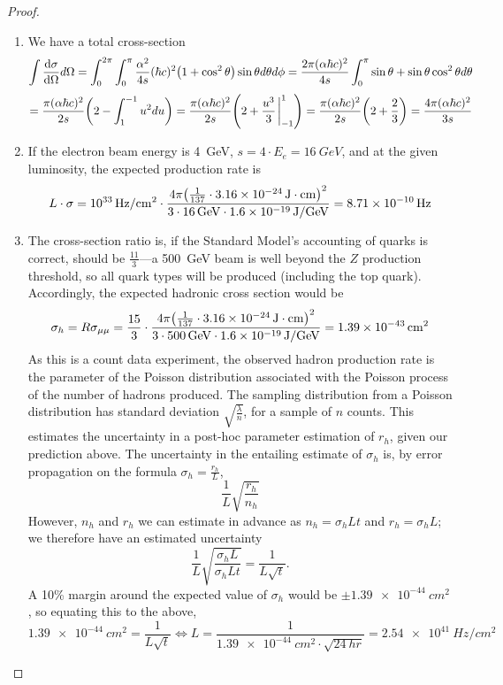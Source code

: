 \documentclass{article}
\begin{document}
\begin{proof} \;
  \begin{enumerate}
  \item We have a total cross-section
    \[
      \int \dv{\sigma}{\Omega} d\Omega = \int_{0}^{2\pi}\int_{0}^{\pi}\frac{\alpha^{2}}{4s}(\hbar c)^{2}\qty(1 + \cos^{2}\theta)\sin\theta
      d\theta d\phi
      = \frac{2\pi(\alpha\hbar c)^{2}}{4s}\int_{0}^{\pi}\sin\theta + \sin\theta\cos^{2}\theta d\theta
    \]
    \[
      = \frac{\pi(\alpha\hbar c)^{2}}{2s}\qty(2 - \int_{1}^{-1}u^{2}du)
      = \frac{\pi(\alpha\hbar c)^{2}}{2s}\qty(2 + \frac{u^{3}}{3}\eval_{-1}^{1})
      = \frac{\pi(\alpha\hbar c)^{2}}{2s}\qty(2 + \frac{2}{3})
      = \frac{4\pi(\alpha\hbar c)^{2}}{3s}
    \]
  \item If the electron beam energy is \SI{4}{GeV}, $s = 4 \cdot E_{e} = \SI{16}{GeV}$, and at the given luminosity,
    the expected production rate is
    \[
      L \cdot \sigma = \SI{e33}{Hz/cm^{2}} \cdot \frac{4\pi\qty(\frac{1}{137} \cdot \SI{3.16e-24}{J \cdot cm})^{2}}
      {3 \cdot \SI{16}{GeV} \cdot \SI{1.6e-19}{J/GeV}}
      = \SI{8.71e-10}{Hz}
    \]
  \item The cross-section ratio is, if the Standard Model's accounting of quarks is correct, should be $\frac{11}{3}$---a
    \SI{500}{GeV} beam is well beyond the $Z$ production threshold, so all quark types will be produced (including the top quark).
    Accordingly, the expected hadronic cross section would be
    \[
      \sigma_{h} = R\sigma_{\mu\mu} = \frac{15}{3} \cdot \frac{4\pi \qty(\frac{1}{137} \cdot \SI{3.16e-24}{J \cdot cm})^{2}}
      {3 \cdot \SI{500}{GeV} \cdot \SI{1.6e-19}{J/GeV}}
      = \SI{1.39e-43}{cm^{2}}
    \]
    As this is a count data experiment, the observed hadron production rate is the parameter of the Poisson distribution
    associated with the Poisson process of the number of hadrons produced.
    The sampling distribution from a Poisson distribution has standard deviation $\sqrt{\frac{\lambda}{n}}$,
    for a sample of $n$ counts.
    This estimates the uncertainty in a post-hoc parameter estimation of $r_{h}$, given our prediction above.
    The uncertainty in the entailing estimate of $\sigma_{h}$ is, by error propagation on the formula $\sigma_{h} = \frac{r_{h}}{L}$,
    \[
      \frac{1}{L}\sqrt{\frac{r_{h}}{n_{h}}}
    \]
    However, $n_{h}$ and $r_{h}$ we can estimate in advance as $n_{h} = \sigma_{h}Lt$ and $r_{h} = \sigma_{h}L$;
    we therefore have an estimated uncertainty
    \[
      \frac{1}{L}\sqrt{\frac{\sigma_{h}L}{\sigma_{h}Lt}} = \frac{1}{L\sqrt{t}}.
    \]
    A 10\% margin around the expected value of $\sigma_{h}$ would be $\pm \SI{1.39e-44}{cm^{2}}$, so equating this to the above,
    \[
      \SI{1.39e-44}{cm^{2}} = \frac{1}{L\sqrt{t}} \Leftrightarrow L = \frac{1}{\SI{1.39e-44}{cm^{2}} \cdot \sqrt{\SI{24}{hr}}}
      = \SI{2.54e41}{Hz/cm^{2}}
    \]
  \end{enumerate}
\end{proof}
\end{document}
